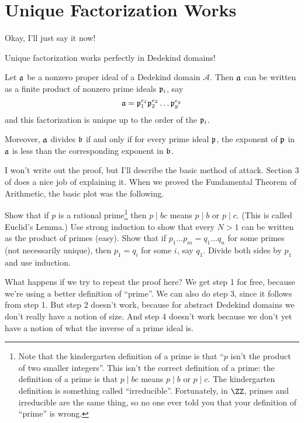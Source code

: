 \section{Unique Factorization Works}
Okay, I'll just say it now!
\begin{moral}
Unique factorization works perfectly in Dedekind domains!
\end{moral}
\begin{theorem}
	Let $\aa$ be a nonzero proper ideal of a Dedekind domain $\mathcal A$.
	Then $\aa$ can be written as a finite product of nonzero prime ideals $\pp_i$, say
	\[ \aa = \pp_1^{e_1} \pp_2^{e_2} \dots \pp_g^{e_g} \]
	and this factorization is unique up to the order of the $\pp_i$.

	Moreover, $\aa$ divides $\bb$ if and only if for every prime ideal $\pp$,
	the exponent of $\pp$ in $\aa$ is less than the corresponding exponent in $\bb$.
\end{theorem}

I won't write out the proof, but I'll describe the basic method of attack.
Section 3 of \cite{ref:ullery} does a nice job of explaining it.
When we proved the Fundamental Theorem of Arithmetic, the basic plot was the following.
\begin{enumerate}[(1)]
	\ii Show that if $p$ is a rational prime\footnote{
		Note that the kindergarten definition of a prime is that ``$p$ isn't the product of two smaller integers''.
		This isn't the correct definition of a prime: the definition of a prime is that $p \mid bc$
		means $p \mid b$ or $p \mid c$.
		The kindergarten definition is something called ``irreducible''.
		Fortunately, in $\ZZ$, primes and irreducible are the same thing,
		so no one ever told you that your definition of ``prime'' is wrong.}
	then $p \mid bc$ means $p \mid b$ or $p \mid c$.  (This is called Euclid's Lemma.)
	\ii Use strong induction to show that every $N > 1$ can be written as the product of primes (easy).
	\ii Show that if $p_1 \dots p_m = q_1 \dots q_n$ for some primes (not necessarily unique),
	then $p_1 = q_i$ for some $i$, say $q_1$.
	\ii Divide both sides by $p_1$ and use induction.
\end{enumerate}
What happens if we try to repeat the proof here?
We get step 1 for free, because we're using a better definition of ``prime''.
We can also do step 3, since it follows from step 1.
But step 2 doesn't work, because for abstract Dedekind domains we don't really have a notion of size.
And step 4 doesn't work because we don't yet have a notion of what the inverse of a prime ideal is.

